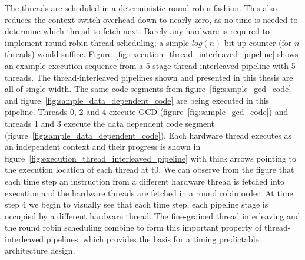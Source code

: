 The threads are scheduled in a deterministic round robin fashion. 
This also reduces the context switch overhead down to nearly zero, as no time is needed to determine which thread to fetch next.
Barely any hardware is required to implement round robin thread scheduling; a simple $log(n)$ bit up counter (for $n$ threads) would suffice.         
Figure~\ref{fig:execution_thread_interleaved_pipeline} shows an example execution sequence from a 5 stage thread-interleaved pipeline with 5 threads.
The thread-interleaved pipelines shown and presented in this thesis are all of single width.
The same code segments from figure~\ref{fig:sample_gcd_code} and figure~\ref{fig:sample_data_dependent_code} are being executed in this pipeline. 
Threads 0, 2 and 4 execute GCD (figure~\ref{fig:sample_gcd_code}) and threads 1 and 3 execute the data dependent code segment (figure~\ref{fig:sample_data_dependent_code}).
Each hardware thread executes as an independent context and their progress is shown in figure~\ref{fig:execution_thread_interleaved_pipeline} with thick arrows pointing to the execution location of each thread at t0.
We can observe from the figure that each time step an instruction from a different hardware thread is fetched into execution and the hardware threads are fetched in a round robin order.
At time step 4 we begin to visually see that each time step, each pipeline stage is occupied by a different hardware thread.
The fine-grained thread interleaving and the round robin scheduling combine to form this important property of thread-interleaved pipelines, which provides the basis for a timing predictable architecture design.

